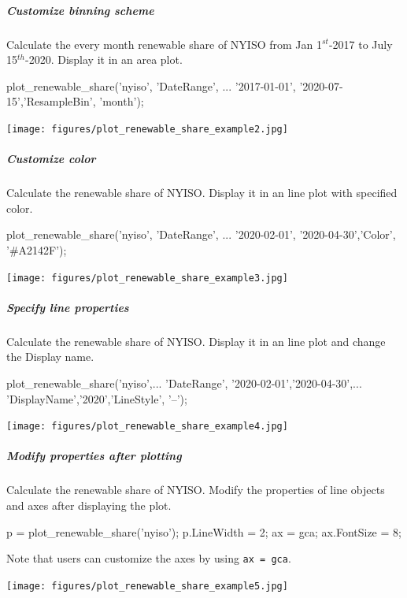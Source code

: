 \documentclass[11pt]{article}
\numberwithin{equation}{section}
\numberwithin{table}{section}
\numberwithin{figure}{section}
\begin{document}
\subparagraph{Customize binning scheme}

Calculate the every month renewable share of NYISO from Jan 1$^{st}$-2017 to July 15$^{th}$-2020. Display it in an area plot.

\begin{Code}
  plot_renewable_share('nyiso', 'DateRange', ...
  {'2017-01-01', '2020-07-15'},'ResampleBin', 'month');
\end{Code}

\begin{center}
  \noindent\texttt{[image: figures/plot\_renewable\_share\_example2.jpg]}
\end{center}

\subparagraph{Customize color}
Calculate the renewable share of NYISO. Display it in an line plot with specified color.

\begin{Code}
  plot_renewable_share('nyiso', 'DateRange', ...
  {'2020-02-01', '2020-04-30'},'Color', '#A2142F');
\end{Code}

\begin{center}
  \noindent\texttt{[image: figures/plot\_renewable\_share\_example3.jpg]}
\end{center}

\subparagraph{Specify line properties}
Calculate the renewable share of NYISO. Display it in an line plot and change the Display name.

\begin{Code}
  plot_renewable_share('nyiso',...
  'DateRange', {'2020-02-01','2020-04-30'},...
  'DisplayName','2020','LineStyle', '--');
\end{Code}

\begin{center}
  \noindent\texttt{[image: figures/plot\_renewable\_share\_example4.jpg]}
\end{center}

\subparagraph{Modify properties after plotting}
Calculate the renewable share of NYISO. Modify the properties of line objects and axes after displaying the plot.

\begin{Code}
  p = plot_renewable_share('nyiso');
  p.LineWidth = 2;
  ax = gca;
  ax.FontSize = 8;
\end{Code}

Note that users can customize the axes by using \verb!ax = gca!.

\begin{center}
  \noindent\texttt{[image: figures/plot\_renewable\_share\_example5.jpg]}
\end{center}
\end{document}
